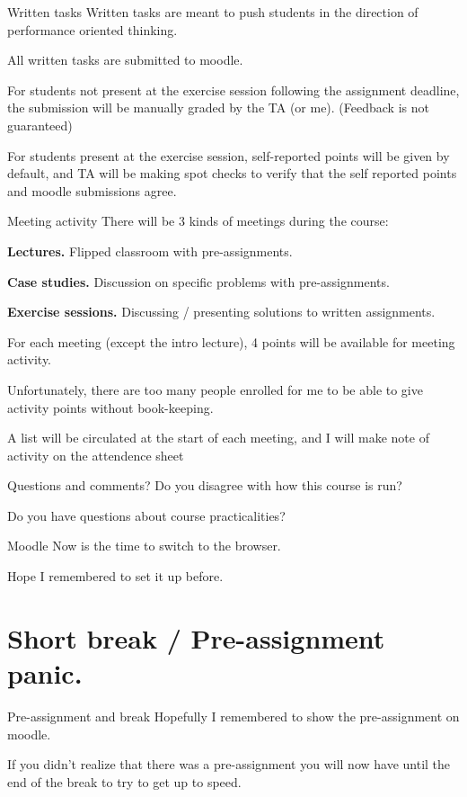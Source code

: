 \documentclass[11pt, aspectratio=169, table]{beamer}
\begin{document}
\begin{frame}{Written tasks}
\setlength\parskip{\fill}
Written tasks are meant to push students in the direction of performance oriented thinking.

All written tasks are submitted to moodle.

For students not present at the exercise session following the assignment deadline, the submission will be 
manually graded by the TA (or me). (Feedback is not guaranteed)

For students present at the exercise session, self-reported points will be given by default, and TA will be making 
spot checks to verify that the self reported points and moodle submissions agree.
\end{frame}


\begin{frame}{Meeting activity}
There will be 3 kinds of meetings during the course:
\begin{description}
	\item{{\bf Lectures.}} Flipped classroom with pre-assignments.
	\item{{\bf Case studies.}} Discussion on specific problems with pre-assignments.
	\item{{\bf Exercise sessions.}} Discussing / presenting solutions to written assignments.
\end{description}

For each meeting (except the intro lecture), 4 points will be available for meeting activity.

Unfortunately, there are too many people enrolled for me to be able to give activity points without book-keeping.

A list will be circulated at the start of each meeting, and I will make note of activity on the attendence sheet
\end{frame}

\begin{frame}{Questions and comments?}
\setlength\parskip{\fill}
Do you disagree with how this course is run?

Do you have questions about course practicalities?
\end{frame}

\begin{frame}{Moodle}
\setlength\parskip{\fill}
Now is the time to switch to the browser.

Hope I remembered to set it up before.
\end{frame}

\section{Short break / Pre-assignment panic.}
\begin{frame}{Pre-assignment and break}
\setlength\parskip{\fill}
Hopefully I remembered to show the pre-assignment on moodle.

If you didn't realize that there was a pre-assignment you will now have until the end of the break to try to get up to speed.
\end{frame}
\end{document}
